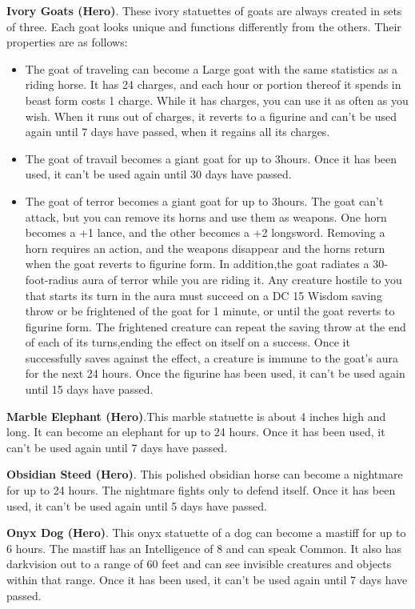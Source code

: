 \textbf{Ivory Goats (Hero)}. These ivory statuettes of goats are always created in sets of three. Each goat looks unique and functions differently from the others. Their properties are as follows:
\begin{itemize}
\item The goat of traveling can become a Large goat with the same statistics as a riding horse. It has 24 charges, and each hour or portion thereof it spends in beast form costs 1 charge. While it has charges, you can use it as often as you wish. When it runs out of charges, it reverts to a figurine and can't be used again until 7 days have passed, when it regains all its charges.
\item The goat of travail becomes a giant goat for up to 3hours. Once it has been used, it can't be used again until 30 days have passed.
\item The goat of terror becomes a giant goat for up to 3hours. The goat can't attack, but you can remove its horns and use them as weapons. One horn becomes a +1 lance, and the other becomes a +2 longsword. Removing a horn requires an action, and the weapons disappear and the horns return when the goat reverts to figurine form. In addition,the goat radiates a 30-foot-radius aura of terror while you are riding it. Any creature hostile to you that starts its turn in the aura must succeed on a DC 15 Wisdom saving throw or be frightened of the goat for 1 minute, or until the goat reverts to figurine form. The frightened creature can repeat the saving throw at the end of each of its turns,ending the effect on itself on a success. Once it successfully saves against the effect, a creature is immune to the goat's aura for the next 24 hours. Once the figurine has been used, it can't be used again until 15 days have passed.
\end{itemize}

\textbf{Marble Elephant (Hero)}.This marble statuette is about 4 inches high and long. It can become an elephant for up to 24 hours. Once it has been used, it can't be used again until 7 days have passed.

\textbf{Obsidian Steed (Hero)}. This polished obsidian horse can become a nightmare for up to 24 hours. The nightmare fights only to defend itself. Once it has been used, it can't be used again until 5 days have passed.

\textbf{Onyx Dog (Hero)}. This onyx statuette of a dog can become a mastiff for up to 6 hours. The mastiff has an Intelligence of 8 and can speak Common. It also has darkvision out to a range of 60 feet and can see invisible creatures and objects within that range. Once it has been used, it can't be used again until 7 days have passed.


